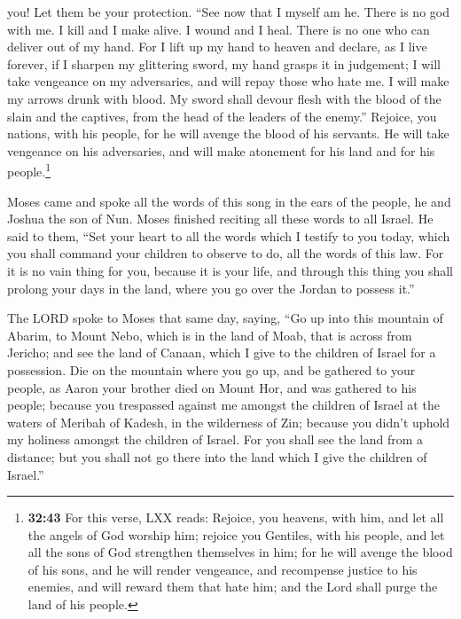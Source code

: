 you! Let them be your protection.  ``See now that I
myself am he. There is no god with me. I kill and I make alive. I wound
and I heal. There is no one who can deliver out of my hand.
 For I lift up my hand to heaven and declare, as I live
forever,  if I sharpen my glittering sword, my hand
grasps it in judgement; I will take vengeance on my adversaries, and
will repay those who hate me.  I will make my arrows
drunk with blood. My sword shall devour flesh with the blood of the
slain and the captives, from the head of the leaders of the enemy.''
 Rejoice, you nations, with his people, for he will
avenge the blood of his servants. He will take vengeance on his
adversaries, and will make atonement for his land and for his
people.\footnote{\textbf{32:43} For this verse, LXX reads: Rejoice, you
  heavens, with him, and let all the angels of God worship him; rejoice
  you Gentiles, with his people, and let all the sons of God strengthen
  themselves in him; for he will avenge the blood of his sons, and he
  will render vengeance, and recompense justice to his enemies, and will
  reward them that hate him; and the Lord shall purge the land of his
  people.}

 Moses came and spoke all the words of this song in the
ears of the people, he and Joshua the son of Nun.  Moses
finished reciting all these words to all Israel.  He said
to them, ``Set your heart to all the words which I testify to you today,
which you shall command your children to observe to do, all the words of
this law.  For it is no vain thing for you, because it is
your life, and through this thing you shall prolong your days in the
land, where you go over the Jordan to possess it.''

 The LORD spoke to Moses that same day, saying,
 ``Go up into this mountain of Abarim, to Mount Nebo,
which is in the land of Moab, that is across from Jericho; and see the
land of Canaan, which I give to the children of Israel for a possession.
 Die on the mountain where you go up, and be gathered to
your people, as Aaron your brother died on Mount Hor, and was gathered
to his people;  because you trespassed against me amongst
the children of Israel at the waters of Meribah of Kadesh, in the
wilderness of Zin; because you didn't uphold my holiness amongst the
children of Israel.  For you shall see the land from a
distance; but you shall not go there into the land which I give the
children of Israel.''

